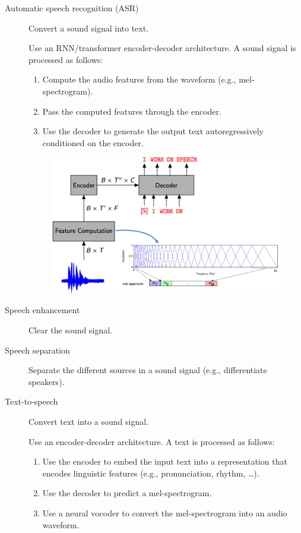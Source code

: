 \begin{description}
    \item[Automatic speech recognition (ASR)]
        Convert a sound signal into text.

        \begin{example}
            Use an RNN/transformer encoder-decoder architecture. A sound signal is processed as follows:
            \begin{enumerate}
                \item Compute the audio features from the waveform (e.g., mel-spectrogram).
                \item Pass the computed features through the encoder.
                \item Use the decoder to generate the output text autoregressively conditioned on the encoder.
            \end{enumerate}

            \begin{figure}[H]
                \centering
                \includegraphics[width=0.5\linewidth]{./img/asp_arch.png}
            \end{figure}
        \end{example}

    \item[Speech enhancement]
        Clear the sound signal.

    \item[Speech separation]
        Separate the different sources in a sound signal (e.g., differentiate speakers).

    \item[Text-to-speech]
        Convert text into a sound signal.

        \begin{example}
            Use an encoder-decoder architecture. A text is processed as follows:
            \begin{enumerate}
                \item Use the encoder to embed the input text into a representation that encodes linguistic features (e.g., pronunciation, rhythm, \dots).
                \item Use the decoder to predict a mel-spectrogram.
                \item Use a neural vocoder to convert the mel-spectrogram into an audio waveform.
            \end{enumerate}


\end{example}
\end{description}
